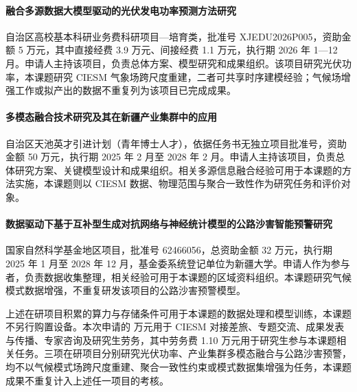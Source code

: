 \paragraph{融合多源数据大模型驱动的光伏发电功率预测方法研究}
自治区高校基本科研业务费科研项目—培育类，批准号 XJEDU2026P005，资助金额 5 万元，其中直接经费 3.9 万元、间接经费 1.1 万元，执行期 2026 年 1—12 月。申请人主持该项目，负责总体方案、模型研究和成果组织。该项目研究光伏功率，本课题研究 CIESM 气象场跨尺度重建，二者可共享时序建模经验；气候场增强工作或拟产出的数据不重复列为该项目已完成成果。

\paragraph{多模态融合技术研究及其在新疆产业集群中的应用}
自治区天池英才引进计划（青年博士人才），依据任务书无独立项目批准号，资助金额 50 万元，执行期 2025 年 2 月至 2028 年 2 月。申请人主持该项目，负责总体研究方案、关键模型设计和成果组织。相关多源信息融合经验可用于本课题的方法实施，本课题则以 CIESM 数据、物理范围与聚合一致性作为研究任务和评价对象。

\paragraph{数据驱动下基于互补型生成对抗网络与神经统计模型的公路沙害智能预警研究}
国家自然科学基金地区项目，批准号 62466056，总资助金额 32 万元，执行期 2025 年 1 月至 2028 年 12 月，基金委系统登记单位为新疆大学。申请人作为参与者，负责数据收集整理，相关经验可用于本课题的区域资料组织。本课题研究气候模式数据增强，不重复研发该项目的公路沙害预警模型。

上述在研项目积累的算力与存储条件可用于本课题的数据处理和模型训练，本课题不另行购置设备。本次申请的  万元用于 CIESM 对接差旅、专题交流、成果发表与传播、专家咨询及研究生劳务，其中劳务费 1.10 万元用于研究生参与本课题相关任务。三项在研项目分别研究光伏功率、产业集群多模态融合与公路沙害预警，均不以气候模式场跨尺度重建、聚合一致性约束或模式数据集增强为任务，本课题成果不重复计入上述任一项目的考核。
